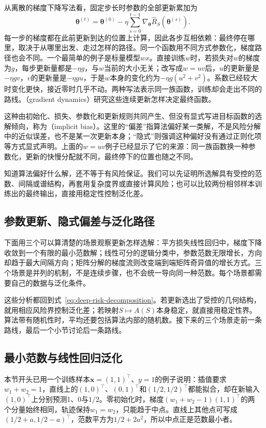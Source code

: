 从离散的梯度下降写法看，固定步长时参数的全部更新累加为
\[
 \bm\theta^{(t)}=\bm\theta^{(0)}
 -\eta\sum_{s=0}^{t-1}\nabla_{\bm\theta}\hat R_S(\bm\theta^{(s)}).
\]
每一步的梯度都在此前更新到达的位置上计算，因此各步互相依赖：最终停在哪里，取决于从哪里出发、走过怎样的路径。同一个函数用不同方式参数化，梯度路径也会不同。一个最简单的例子是标量模型$wx$。直接训练$w$时，若损失对$w$的梯度为$g$，每步更新量都是$-\eta g$，与$w$当前的大小无关；改写成$w=uv$后，$u$的更新量是$-\eta gv$，$v$的更新量是$-\eta gu$，于是$w$本身的变化约为$-\eta g(u^2+v^2)$。系数已经较大时变化更快，接近零时几乎不动。两种写法表示同一族函数，训练却会走出不同的路线。（gradient dynamics）研究这些连续更新怎样决定最终函数。

这种由初始化、损失、参数化和更新规则共同产生、但没有显式写进目标函数的选解倾向，称为（implicit bias）。这里的“偏差”指算法偏好某一类解，不是风险分解中的近似误差，也不是某一次更新本身；“隐式”则强调这种偏好没有通过正则化项等方式显式声明。上面的$w=uv$例子已经显示了它的来源：同一族函数换一种参数化，更新的快慢分配就不同，最终停下的位置也随之不同。

知道算法偏好什么解，还不等于有风险保证。我们可以先证明所选解具有受控的范数、间隔或谱结构，再套用复杂度界或直接计算风险；也可以比较两份相邻样本训练出的最终输出，直接用稳定性控制泛化差。

\subsection{参数更新、隐式偏差与泛化路径}

下面用三个可以算清楚的场景观察更新怎样选解：平方损失线性回归中，梯度下降收敛到一个有限的最小范数解；线性可分的逻辑分类中，参数范数无限增长，方向却趋于最大间隔方向；矩阵分解的梯度流则改变端到端矩阵奇异值的增长方式。三个场景是并列的机制，不是连续步骤，也不会统一导向同一种范数。每个场景都需要自己的数据与泛化条件。

这些分析都回到式~\eqref{eq:deep-risk-decomposition}。若更新选出了受控的几何结构，就用相应风险界控制泛化差；若映射$S\mapsto A(S)$本身稳定，就直接用稳定性界。算法带有随机性时，平均还要包括算法内部的随机数。接下来的三个场景走前一条路线，最后一个小节讨论后一条路线。

\subsection{最小范数与线性回归泛化}

本节开头已用一个训练样本$\bm x=(1,1)^\top$、$y=1$的例子说明：插值要求$w_1+w_2=1$，直线上的$(1,0)^\top$、$(0,1)^\top$和$(1/2,1/2)^\top$都能拟合，却在新输入$(1,0)^\top$上分别预测1、0与$1/2$。零初始化时，梯度$(w_1+w_2-1)(1,1)^\top$的两个分量始终相同，轨迹保持$w_1=w_2$，只能趋于中点。直线上其他点可写成$(1/2+a,1/2-a)^\top$，范数平方为$1/2+2a^2$，所以中点正是范数最小者。

